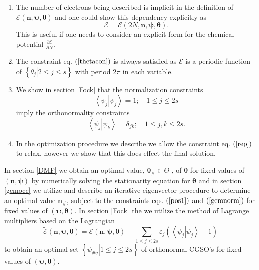 \documentclass[aps,preprint]{revtex4}%
\begin{document}
\begin{enumerate}
\item The number of electrons being described is implicit in the definition of
$\mathcal{E}\left(  \mathbf{n,\psi,\theta}\right)  $ and one could show this
dependency explicitly as
\begin{equation}
\mathcal{E}=\mathcal{E}\left(  2N,\mathbf{n,\psi,\theta}\right)  .
\end{equation}
This is useful if one needs to consider an explicit form for the chemical
potential $\frac{\partial\mathcal{E}}{\partial N}.$

\item The constraint eq. $\left(  \ref{thetacon}\right)  $ is always satisfied
as $\mathcal{E}$ is a periodic function of $\left\{  \left.  \theta
_{j}\right\vert 2\leq j\leq s\right\}  $ with period $2\pi$ in each variable.

\item We show in section \ref{Fock} that the normalization constraints
\begin{equation}
\left\langle \left.  \psi_{j}\right\vert \psi_{j}\right\rangle =1;\quad1\leq
j\leq2s \label{norm}%
\end{equation}
imply the orthonormality constraints
\begin{equation}
\left\langle \left.  \psi_{j}\right\vert \psi_{k}\right\rangle =\delta
_{jk};\quad1\leq j,k\leq2s.
\end{equation}


\item In the optimization procedure we describe we allow the constraint eq.
$\left(  \ref{rep}\right)  $ to relax, however we show that this does effect
the final solution.
\end{enumerate}

In section \ref{DMF} we obtain an optimal value, $\mathbf{\theta}_{\#}%
\in\Theta$ , of $\mathbf{\theta}$ for fixed values of $\left(  \mathbf{n,\psi
}\right)  $ by numerically solving the stationarity equation for
$\mathbf{\theta}$ and in section \ref{gemocc} we utilize and describe an
iterative eigenvector procedure to determine an optimal value $\mathbf{n}%
_{\#}$, subject to the constraints eqs. $\left(  \ref{pos1}\right)  $ and
$\left(  \ref{gemnorm}\right)  $ for fixed values of $\left(  \mathbf{\psi
,\theta}\right)  $. In section \ref{Fock} the we utilize the method of
Lagrange multipliers based on the Lagrangian
\begin{equation}
\mathcal{\tilde{E}}\left(  \mathbf{n,\psi,\theta}\right)  =\mathcal{E}\left(
\mathbf{n,\psi,\theta}\right)  -\sum_{1\leq j\leq2s}\varepsilon_{j}\left(
\left\langle \left.  \psi_{j}\right\vert \psi_{j}\right\rangle -1\right)
\label{larE}%
\end{equation}
to obtain an optimal set $\left\{  \left.  \psi_{\#j}\right\vert 1\leq
j\leq2s\right\}  $ of orthonormal CGSO's for fixed values of $\left(
\mathbf{\psi,\theta}\right)  $.
\end{document}
